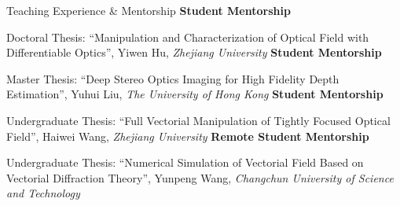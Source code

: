 \begin{rubric}{Teaching Experience \& Mentorship}
    \entry*[2021 -- 2026]%
    \textbf{Student Mentorship}
    \par Doctoral Thesis: ``Manipulation and Characterization of Optical Field with Differentiable Optics'', Yiwen Hu, \textit{Zhejiang University}
    \entry*[2023]%
    \textbf{Student Mentorship}
    \par Master Thesis: ``Deep Stereo Optics Imaging for High Fidelity Depth Estimation'', Yuhui Liu, \textit{The University of Hong Kong}
    \entry*[2022]%
    \textbf{Student Mentorship}
    \par Undergraduate Thesis: ``Full Vectorial Manipulation of Tightly Focused Optical Field'', Haiwei Wang, \textit{Zhejiang University}
    \entry*[2022]%
    \textbf{Remote Student Mentorship}
    \par Undergraduate Thesis: ``Numerical Simulation of Vectorial Field Based on Vectorial Diffraction Theory'', Yunpeng Wang, \textit{Changchun University of Science and Technology}
\end{rubric}